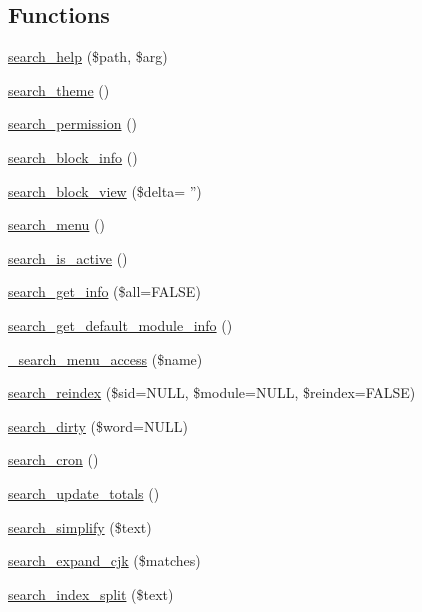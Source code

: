 \subsection*{Functions}
\begin{DoxyCompactItemize}
\item 
\hyperlink{search_8module_aa8106bfd7c3a1254dcb89195ab219b5b}{search\_\-help} (\$path, \$arg)
\item 
\hyperlink{search_8module_a8522ae1e4902ce2907b7515e340b711e}{search\_\-theme} ()
\item 
\hyperlink{search_8module_a56dd5c08835642b32744dfea3762a419}{search\_\-permission} ()
\item 
\hyperlink{search_8module_a2f13d2fc1d549a040d7bdbda511710a0}{search\_\-block\_\-info} ()
\item 
\hyperlink{search_8module_a04d7ad10e5af7a7053b386f9b5e70304}{search\_\-block\_\-view} (\$delta= '')
\item 
\hyperlink{search_8module_ac0cbdaa688ee15c024867c96b54a4036}{search\_\-menu} ()
\item 
\hyperlink{search_8module_ade9a3743480b1b0ea05d80f54b466442}{search\_\-is\_\-active} ()
\item 
\hyperlink{search_8module_aa36af44ad9f887b93fdfcf33daa9cb1e}{search\_\-get\_\-info} (\$all=FALSE)
\item 
\hyperlink{search_8module_abb3b45a6704ffdb16799bdd5e69a39ef}{search\_\-get\_\-default\_\-module\_\-info} ()
\item 
\hyperlink{search_8module_ad23d575da2f572416a56555fe51fc565}{\_\-search\_\-menu\_\-access} (\$name)
\item 
\hyperlink{search_8module_a66509986c2ec235db1bf94f010d6675d}{search\_\-reindex} (\$sid=NULL, \$module=NULL, \$reindex=FALSE)
\item 
\hyperlink{search_8module_ab872d5ac0d09e2de39d856606092ed02}{search\_\-dirty} (\$word=NULL)
\item 
\hyperlink{search_8module_a60454d8bc91689e5d91b1a8c4e02c412}{search\_\-cron} ()
\item 
\hyperlink{search_8module_a60e12125cc5e7713d2e73ad944b3ac24}{search\_\-update\_\-totals} ()
\item 
\hyperlink{search_8module_ac33f1e93d9bed7ebf9b4908287618beb}{search\_\-simplify} (\$text)
\item 
\hyperlink{search_8module_a7088ffdfda833c7047b38f470a806a24}{search\_\-expand\_\-cjk} (\$matches)
\item 
\hyperlink{search_8module_a5435e73f4dc935b243e2e08f34a57d1d}{search\_\-index\_\-split} (\$text)

\end{DoxyCompactItemize}

